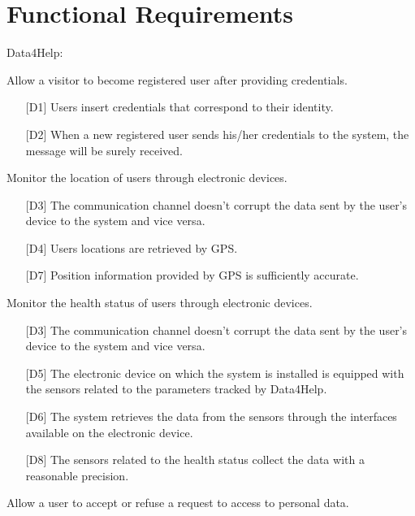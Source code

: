\section{Functional Requirements}
Data4Help:  
\begin{enumerate} [label={[G\arabic*]}]
    \item Allow a visitor to become registered user after providing credentials.
        \begin{itemize}
            \item [{[D1]}] Users insert credentials that correspond to their identity.
            \item [{[D2]}] When a new registered user sends his/her credentials to the system, the message will be surely received.
        \end{itemize}
        
    \item Monitor the location of users through electronic devices.
        \begin{itemize}
            \item [{[D3]}] The communication channel doesn't corrupt the data sent by the user's device to the system and vice versa.
            \item [{[D4]}] Users locations are retrieved by GPS.
            \item [{[D7]}] Position information provided by GPS is sufficiently accurate.
        \end{itemize}
        
    \item Monitor the health status of users through electronic devices.
        \begin{itemize}
            \item [{[D3]}] The communication channel doesn't corrupt the data sent by the user's device to the system and vice versa.
            \item [{[D5]}] The electronic device on which the system is installed is equipped with the sensors related to the parameters tracked by Data4Help.
            \item [{[D6]}] The  system  retrieves  the  data  from  the  sensors  through  the  interfaces available on the electronic device.
            \item [{[D8]}] The sensors related to the health status collect the data with a reasonable precision.
        \end{itemize}
        
    \item Allow a user to accept or refuse a request to access to personal data.
    

\end{enumerate}
